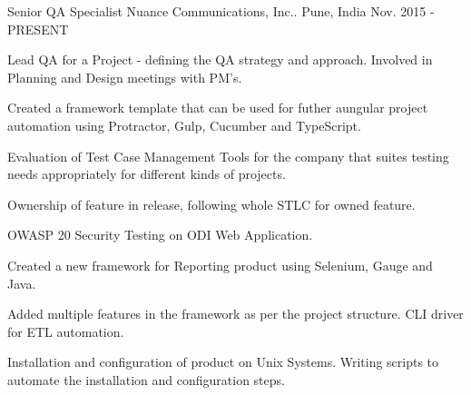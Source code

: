 

\begin{cventries}

  \cventry
    {Senior QA Specialist} %
    {Nuance Communications, Inc..} %
    {Pune, India} %
    {Nov. 2015 - PRESENT} %
    {
      \begin{cvitems} %
	    \item {Lead QA for a Project - defining the QA strategy and approach. Involved in Planning and Design meetings with PM's.}
		\item {Created a framework template that can be used for futher aungular project automation using Protractor, Gulp, Cucumber and TypeScript.}
		\item {Evaluation of Test Case Management Tools for the company that suites testing needs appropriately for different kinds of projects.}
        \item {Ownership of feature in release, following whole STLC for owned feature.}
		\item {OWASP 20 Security Testing on ODI Web Application.}
        \item {Created a new framework for Reporting product using Selenium, Gauge and Java.}
        \item {Added multiple features in the framework as per the project structure. CLI driver for ETL automation.}
        \item {Installation and configuration of product on Unix Systems. Writing scripts to automate the installation and configuration steps.}
      \end{cvitems}
    }


\end{cventries}
